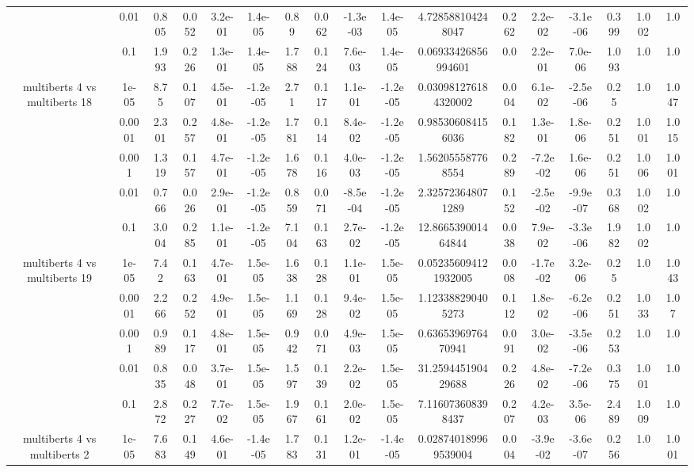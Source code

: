 \begin{tabular}{|c|c|c|c|c|c|c|c|c|c|c|c|c|c|c|c|c|}
 & 0.01 & 0.805 & 0.052 & 3.2e-01 & 1.4e-05 & 0.89 & 0.062 & -1.3e-03 & 1.4e-05 & 4.728588104248047 & 0.262 & 2.2e-02 & -3.1e-06 & 0.399 & 1.002 & 1.0 \\
 & 0.1 & 1.993 & 0.226 & 1.3e-01 & 1.4e-05 & 1.788 & 0.124 & 7.6e-03 & 1.4e-05 & 0.06933426856994601 & 0.0 & 2.2e-01 & 7.0e-06 & 1.093 & 1.0 & 1.0 \\
\hline
\multirow{5}{*}{multiberts 4 vs multiberts 18} & 1e-05 & 8.75 & 0.107 & 4.5e-01 & -1.2e-05 & 2.71 & 0.117 & 1.1e-01 & -1.2e-05 & 0.030981276184320002 & 0.004 & 6.1e-02 & -2.5e-06 & 0.25 & 1.0 & 1.047 \\
 & 0.0001 & 2.301 & 0.257 & 4.8e-01 & -1.2e-05 & 1.781 & 0.114 & 8.4e-02 & -1.2e-05 & 0.985306084156036 & 0.182 & 1.3e-01 & 1.8e-06 & 0.251 & 1.001 & 1.015 \\
 & 0.001 & 1.319 & 0.157 & 4.7e-01 & -1.2e-05 & 1.678 & 0.116 & 4.0e-03 & -1.2e-05 & 1.562055587768554 & 0.289 & -7.2e-02 & 1.6e-06 & 0.251 & 1.006 & 1.001 \\
 & 0.01 & 0.766 & 0.026 & 2.9e-01 & -1.2e-05 & 0.859 & 0.071 & -8.5e-04 & -1.2e-05 & 2.325723648071289 & 0.152 & -2.5e-02 & -9.9e-07 & 0.368 & 1.002 & 1.0 \\
 & 0.1 & 3.004 & 0.285 & 1.1e-01 & -1.2e-05 & 7.104 & 0.163 & 2.7e-02 & -1.2e-05 & 12.866539001464844 & 0.038 & 7.9e-02 & -3.3e-06 & 1.982 & 1.002 & 1.0 \\
\hline
\multirow{5}{*}{multiberts 4 vs multiberts 19} & 1e-05 & 7.42 & 0.163 & 4.7e-01 & 1.5e-05 & 1.638 & 0.128 & 1.1e-01 & 1.5e-05 & 0.052356094121932005 & 0.008 & -1.7e-02 & 3.2e-06 & 0.25 & 1.0 & 1.043 \\
 & 0.0001 & 2.266 & 0.252 & 4.9e-01 & 1.5e-05 & 1.169 & 0.128 & 9.4e-02 & 1.5e-05 & 1.123388290405273 & 0.112 & 1.8e-02 & -6.2e-06 & 0.251 & 1.033 & 1.07 \\
 & 0.001 & 0.989 & 0.117 & 4.8e-01 & 1.5e-05 & 0.942 & 0.071 & 4.9e-03 & 1.5e-05 & 0.6365396976470941 & 0.091 & 3.0e-02 & -3.5e-06 & 0.253 & 1.0 & 1.0 \\
 & 0.01 & 0.835 & 0.048 & 3.7e-01 & 1.5e-05 & 1.597 & 0.139 & 2.2e-02 & 1.5e-05 & 31.259445190429688 & 0.226 & 4.8e-02 & -7.2e-06 & 0.375 & 1.001 & 1.0 \\
 & 0.1 & 2.872 & 0.227 & 7.7e-02 & 1.5e-05 & 1.967 & 0.161 & 2.0e-02 & 1.5e-05 & 7.116073608398437 & 0.207 & 4.2e-03 & 3.5e-06 & 2.489 & 1.009 & 1.0 \\
\hline
\multirow{5}{*}{multiberts 4 vs multiberts 2} & 1e-05 & 7.683 & 0.149 & 4.6e-01 & -1.4e-05 & 1.783 & 0.131 & 1.2e-01 & -1.4e-05 & 0.028740189969539004 & 0.004 & -3.9e-02 & -3.6e-07 & 0.256 & 1.0 & 1.001 \\

\end{tabular}

